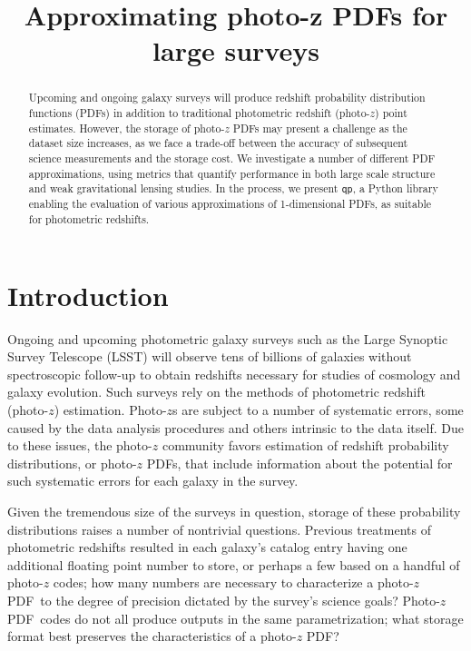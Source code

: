 \documentclass[\docopts]{\docclass}
\newcommand{\qp}{\texttt{qp}}
\newcommand{\pz}{photo-$z$ PDF}
\newcommand{\Pz}{Photo-$z$ PDF}
\begin{document}
\title{ Approximating photo-z PDFs for large surveys }


\begin{abstract}

Upcoming and ongoing galaxy surveys will produce redshift probability 
distribution functions (PDFs) in addition to traditional photometric redshift 
(photo-$z$) point estimates.  However, the storage of \pz s may present a 
challenge as the dataset size increases, as we face a trade-off between the 
accuracy of subsequent science measurements and the storage cost. We 
investigate a number of different PDF approximations, using metrics that 
quantify performance in both large scale structure and weak gravitational 
lensing studies. In the process, we present \qp, a Python library enabling the 
evaluation of various approximations of 1-dimensional PDFs, as suitable for 
photometric redshifts.

\end{abstract}






\section{Introduction}
\label{sec:intro}


Ongoing and upcoming photometric galaxy surveys such as the Large Synoptic 
Survey Telescope (LSST) will observe tens of billions of galaxies without 
spectroscopic follow-up to obtain redshifts necessary for studies of cosmology 
and galaxy evolution.  Such surveys rely on the methods of photometric redshift 
(photo-$z$) estimation.  Photo-$z$s are subject to a number of systematic 
errors, some caused by the data analysis procedures and others intrinsic to the 
data itself.  Due to these issues, the photo-$z$ community favors estimation of 
redshift probability distributions, or \pz s, that include information about 
the potential for such systematic errors for each galaxy in the survey.

Given the tremendous size of the surveys in question, storage of these 
probability distributions raises a number of nontrivial questions.  Previous 
treatments of photometric redshifts resulted in each galaxy's catalog entry 
having one additional floating point number to store, or perhaps a few based on 
a handful of photo-$z$ codes; how many numbers are necessary to characterize a 
\pz\ to the degree of precision dictated by the survey's science goals?  \Pz\  
codes do not all produce outputs in the same parametrization; what storage 
format best preserves the characteristics of a \pz?
\end{document}
